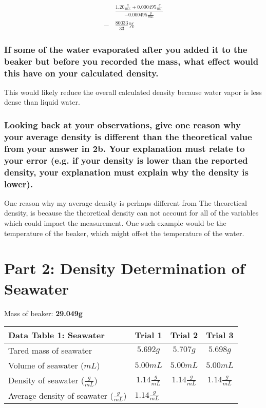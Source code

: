 \documentclass[a4paper,10pt]{article}
\begin{document}
\begin{align}
&\frac{1.20\frac{g}{mL} + 0.000495\frac{g}{mL}}{-0.000495\frac{g}{mL}} \\
-&\frac{80033}{33}\% 
\end{align}


\subsubsection*{If some of the water evaporated after you added it to the beaker but before you recorded the mass, what effect would this have on your calculated density.}

This would likely reduce the overall calculated density because water vapor is less dense than liquid water.

\subsubsection*{Looking back at your observations, give one reason why your average density is different than the theoretical value from your answer in 2b. Your explanation must relate to your error (e.g. if your density is lower than the reported density, your explanation must explain why the density is lower).}

One reason why my average density is perhaps different from The theoretical density, is because the theoretical density can not account for all of the variables which could impact the measurement. One such example would be the temperature of the beaker, which might offset the temperature of the water.  

\section{Part 2: Density Determination of Seawater}

Mass of beaker: \textbf{29.049g}

\begin{table}[h!]
\renewcommand{\arraystretch}{1.5}
\label{tab:table1}
\begin{tabular}{|l|c|c|c|}
\hline
\textbf{Data Table 1: Seawater} & \textbf{Trial 1} & \textbf{Trial 2} & \textbf{Trial 3}\\
\hline
Tared mass of seawater & $5.692g$ & $5.707g$ & $5.698g$ \\
\hline
Volume of seawater ($mL$) & $5.00mL$ & $5.00mL$ & $5.00mL$ \\
\hline
Density of seawater ($\frac{g}{mL}$) & $1.14\frac{g}{mL}$ &  $1.14\frac{g}{mL}$ & $1.14\frac{g}{mL}$ \\
\hline
Average density of seawater ($\frac{g}{mL}$) & \multicolumn{2}{l}{$1.14\frac{g}{mL}$} & \\
\hline
\end{tabular}
\end{table}
\end{document}

